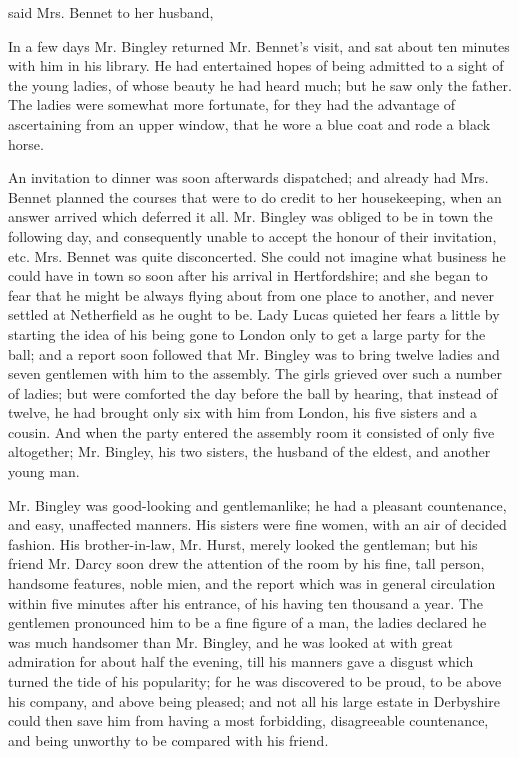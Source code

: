  said Mrs. Bennet to her husband, 

In a few days Mr. Bingley returned Mr. Bennet's visit, and sat about ten minutes with him in his library. He had entertained hopes of being admitted to a sight of the young ladies, of whose beauty he had heard much; but he saw only the father. The ladies were somewhat more fortunate, for they had the advantage of ascertaining from an upper window, that he wore a blue coat and rode a black horse.

An invitation to dinner was soon afterwards dispatched; and already had Mrs. Bennet planned the courses that were to do credit to her housekeeping, when an answer arrived which deferred it all. Mr. Bingley was obliged to be in town the following day, and consequently unable to accept the honour of their invitation, etc. Mrs. Bennet was quite disconcerted. She could not imagine what business he could have in town so soon after his arrival in Hertfordshire; and she began to fear that he might be always flying about from one place to another, and never settled at Netherfield as he ought to be. Lady Lucas quieted her fears a little by starting the idea of his being gone to London only to get a large party for the ball; and a report soon followed that Mr. Bingley was to bring twelve ladies and seven gentlemen with him to the assembly. The girls grieved over such a number of ladies; but were comforted the day before the ball by hearing, that instead of twelve, he had brought only six with him from London, his five sisters and a cousin. And when the party entered the assembly room it consisted of only five altogether; Mr. Bingley, his two sisters, the husband of the eldest, and another young man.

Mr. Bingley was good-looking and gentlemanlike; he had a pleasant countenance, and easy, unaffected manners. His sisters were fine women, with an air of decided fashion. His brother-in-law, Mr. Hurst, merely looked the gentleman; but his friend Mr. Darcy soon drew the attention of the room by his fine, tall person, handsome features, noble mien, and the report which was in general circulation within five minutes after his entrance, of his having ten thousand a year. The gentlemen pronounced him to be a fine figure of a man, the ladies declared he was much handsomer than Mr. Bingley, and he was looked at with great admiration for about half the evening, till his manners gave a disgust which turned the tide of his popularity; for he was discovered to be proud, to be above his company, and above being pleased; and not all his large estate in Derbyshire could then save him from having a most forbidding, disagreeable countenance, and being unworthy to be compared with his friend.

